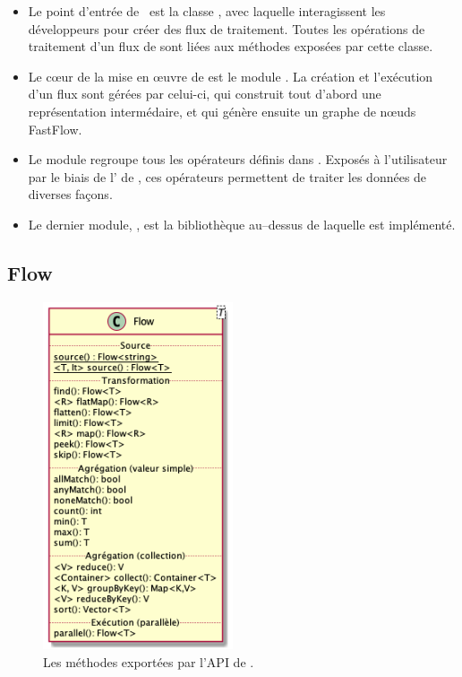 \begin{itemize}

\item Le point d'entr\'ee de \ppff\ est la classe , avec laquelle interagissent les d\'eveloppeurs pour cr\'eer des flux de traitement. Toutes les op\'erations de traitement d'un flux de  sont li\'ees aux m\'ethodes expos\'ees par cette classe. 

\item Le c\oe{}ur de la mise en \oe{}uvre de  est le module . La cr\'eation et l'ex\'ecution d'un flux sont g\'er\'ees par celui-ci, qui construit tout d'abord une représentation intermédaire, et qui génère ensuite un graphe de n\oe{}uds FastFlow.

\item  Le module  regroupe tous les op\'erateurs d\'efinis dans . Expos\'es \`a l'utilisateur par le biais de l' de , ces op\'erateurs permettent de traiter les donn\'ees de diverses façons.

\item Le dernier module, , est la biblioth\`eque au–dessus de laquelle  est impl\'ement\'e.


\end{itemize}

\subsection{Flow}
\label{flow.chap}

\begin{figure}
\centering
     \includegraphics[width=0.5\textwidth]{Figures/flow-details.png}
      \caption{Les m\'ethodes export\'ees par l'API de .}
       \label{Flow.fig}
\end{figure}



